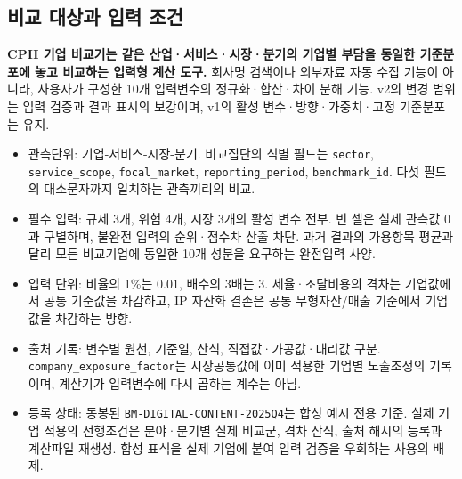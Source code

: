 \subsection*{비교 대상과 입력 조건}
\textbf{CPII 기업 비교기는 같은 산업·서비스·시장·분기의 기업별 부담을 동일한 기준분포에 놓고 비교하는 입력형 계산 도구.} 회사명 검색이나 외부자료 자동 수집 기능이 아니라, 사용자가 구성한 10개 입력변수의 정규화·합산·차이 분해 기능. v2의 변경 범위는 입력 검증과 결과 표시의 보강이며, v1의 활성 변수·방향·가중치·고정 기준분포는 유지.

\begin{itemize}[leftmargin=1.8em,itemsep=0.3em]
\item 관측단위: 기업-서비스-시장-분기. 비교집단의 식별 필드는 \nolinkurl{sector}, \nolinkurl{service_scope}, \nolinkurl{focal_market}, \nolinkurl{reporting_period}, \nolinkurl{benchmark_id}. 다섯 필드의 대소문자까지 일치하는 관측끼리의 비교.
\item 필수 입력: 규제 3개, 위험 4개, 시장 3개의 활성 변수 전부. 빈 셀은 실제 관측값 0과 구별하며, 불완전 입력의 순위·점수차 산출 차단. 과거 결과의 가용항목 평균과 달리 모든 비교기업에 동일한 10개 성분을 요구하는 완전입력 사양.
\item 입력 단위: 비율의 1\%는 \(0.01\), 배수의 3배는 \(3\). 세율·조달비용의 격차는 기업값에서 공통 기준값을 차감하고, IP 자산화 결손은 공통 무형자산/매출 기준에서 기업값을 차감하는 방향.
\item 출처 기록: 변수별 원천, 기준일, 산식, 직접값·가공값·대리값 구분. \nolinkurl{company_exposure_factor}는 시장공통값에 이미 적용한 기업별 노출조정의 기록이며, 계산기가 입력변수에 다시 곱하는 계수는 아님.
\item 등록 상태: 동봉된 \nolinkurl{BM-DIGITAL-CONTENT-2025Q4}는 합성 예시 전용 기준. 실제 기업 적용의 선행조건은 분야·분기별 실제 비교군, 격차 산식, 출처 해시의 등록과 계산파일 재생성. 합성 표식을 실제 기업에 붙여 입력 검증을 우회하는 사용의 배제.
\end{itemize}


